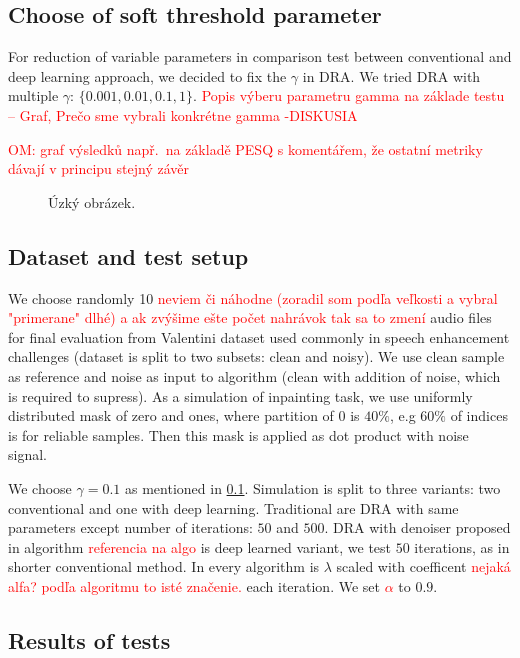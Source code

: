 \documentclass[conference]{IEEEtran}
\newcommand{\todo}[1]{\textcolor{red}{#1}}
\begin{document}
\subsection{Choose of soft threshold parameter}\label{subsec:soft_thresh}

For reduction of variable parameters in comparison test between conventional and deep learning approach, we decided to fix the $\gamma$ in DRA.
We tried DRA with multiple $\gamma$: $\{0.001, 0.01,0.1, 1\}$.
\todo{Popis výberu parametru gamma na základe testu -- Graf, Prečo sme vybrali konkrétne gamma -DISKUSIA}

\todo{OM: graf výsledků např.\ na základě PESQ s komentářem, že ostatní metriky dávají v principu stejný závěr}

\begin{figure}
	\caption{Úzký obrázek.}
\end{figure}

\subsection{Dataset and test setup}
We choose randomly 10 \todo{neviem či náhodne (zoradil som podľa veľkosti a vybral "primerane" dlhé) a ak zvýšime ešte počet nahrávok tak sa to zmení} audio files for final evaluation from Valentini dataset \cite{ValentiniBotinhao2017} used commonly in speech enhancement challenges (dataset is split to two subsets: clean and noisy).
We use clean sample as reference and noise as input to algorithm (clean with addition of noise, which is required to supress).
As a simulation of inpainting task, we use uniformly distributed mask of zero and ones, where partition of 0 is $40\%$,
e.g $60\%$ of indices is for reliable samples.
Then this mask is applied as dot product with noise signal.

We choose $\gamma = 0.1$ as mentioned in \ref{subsec:soft_thresh}.
Simulation is split to three variants: two conventional and one with deep learning.
Traditional are DRA with same parameters except number of iterations: $50$ and $500$.
DRA with denoiser proposed in algorithm \todo{referencia na algo} is deep learned variant, we test $50$ iterations,
as in shorter conventional method.
In every algorithm is $\lambda$ scaled with coefficent \todo{nejaká alfa? podľa algoritmu to isté značenie.} each iteration.
We set \todo{$\alpha$} to $0.9$.




\subsection{Results of tests}
\end{document}
